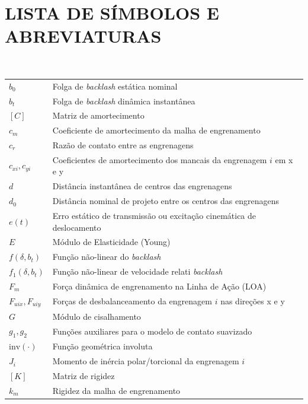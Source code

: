 
\chapter*{\MakeUppercase{Lista de Símbolos e Abreviaturas}}

 \\
\begingroup
\begin{longtable}{p{} p{}}
	$ b_0 $ & Folga de \textit{backlash} estática nominal \\
	$ b_t $ & Folga de \textit{backlash} dinâmica instantânea \\
	$ [C] $ & Matriz de amortecimento \\
	$ c_m $ & Coeficiente de amortecimento da malha de engrenamento \\
	$ c_r $ & Razão de contato entre as engrenagens \\
	$ c_{xi}, c_{yi} $ & Coeficientes de amortecimento dos mancais da engrenagem $i$ em x e y \\
	$ d $ & Distância instantânea de centros das engrenagens \\
	$ d_0 $ & Distância nominal de projeto entre os centros das engrenagens \\
	$ e(t) $ & Erro estático de transmissão ou excitação cinemática de deslocamento \\
	$E$ & Módulo de Elasticidade (Young) \\
	$ f(\delta, b_t) $ & Função não-linear do \textit{backlash} \\
	$ f_1(\delta, b_t) $ & Função não-linear de velocidade relati \textit{backlash} \\
	$ F_m $ & Força dinâmica de engrenamento na Linha de Ação (LOA) \\
	$ F_{uix}, F_{uiy} $ & Forças de desbalanceamento da engrenagem $i$ nas direções x e y \\
	$G$ & Módulo de cisalhamento \\
	$ g_1, g_2 $ & Funções auxiliares para o modelo de contato suavizado \\
	$ \mathrm{inv}(\cdot) $ & Função geométrica involuta \\
	$ J_i $ & Momento de inércia polar/torcional da engrenagem $i$ \\
	$ [K] $ & Matriz de rigidez \\
	$ k_m $ & Rigidez da malha de engrenamento \\

\end{longtable}
